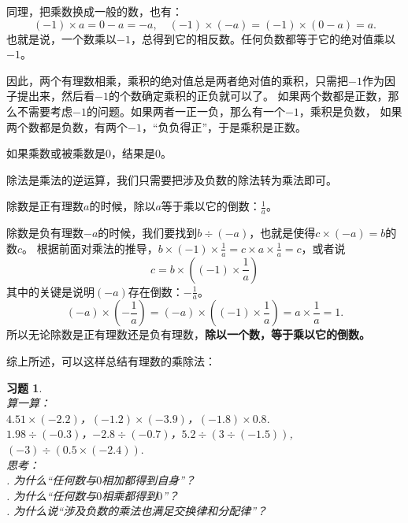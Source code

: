 \documentclass[12pt,UTF8]{ctexbook}
\newtheorem{xt}{习题}[section]
\begin{document}
同理，把乘数换成一般的数，也有：
$$(-1) \times a =  0 - a = -a, \quad (-1) \times (-a) = (-1) \times (0 - a) = a.$$
也就是说，一个数乘以$-1$，总得到它的相反数。任何负数都等于它的绝对值乘以$-1$。

因此，两个有理数相乘，乘积的绝对值总是两者绝对值的乘积，只需把$-1$作为因子提出来，然后看$-1$的个数确定乘积的正负就可以了。
如果两个数都是正数，那么不需要考虑$-1$的问题。如果两者一正一负，那么有一个$-1$，乘积是负数，
如果两个数都是负数，有两个$-1$，“负负得正”，于是乘积是正数。

如果乘数或被乘数是$0$，结果是$0$。

除法是乘法的逆运算，我们只需要把涉及负数的除法转为乘法即可。

除数是正有理数$a$的时候，除以$a$等于乘以它的倒数：$\frac{1}{a}$。

除数是负有理数$-a$的时候，我们要找到$b \div (-a)$，也就是使得$c \times (-a) = b$的数$c$。
根据前面对乘法的推导，$ b \times (-1) \times \frac{1}{a} = c \times a \times \frac{1}{a} = c$，或者说
$$c = b\times \left((-1) \times \frac{1}{a}\right)$$
其中的关键是说明$(-a)$存在倒数：$-\frac{1}{a}$。
$$ (-a)\times \left(-\frac{1}{a}\right) = (-a)\times \left((-1) \times \frac{1}{a}\right) = a \times \frac{1}{a} = 1. $$
所以无论除数是正有理数还是负有理数，\textbf{除以一个数，等于乘以它的倒数。}

综上所述，可以这样总结有理数的乘除法：
\begin{center}
\end{center}

\begin{xt}\label{xt:3-0-1}
    \mbox{}\\
    \indent 算一算：\\
    \indent $4.51 \times (-2.2)$，$(-1.2) \times (-3.9)$，$(-1.8)\times 0.8.$ \\
    \indent $1.98 \div (-0.3)$，$-2.8 \div (-0.7)$，$5.2 \div (3 \div (-1.5))$, $(-3) \div (0.5 \times (-2.4)).$ \\
    \indent 思考：\\
    . 为什么“任何数与$0$相加都得到自身”？\\
    . 为什么“任何数与$0$相乘都得到$0$”？\\
    . 为什么说“涉及负数的乘法也满足交换律和分配律”？
\end{xt}
\end{document}
